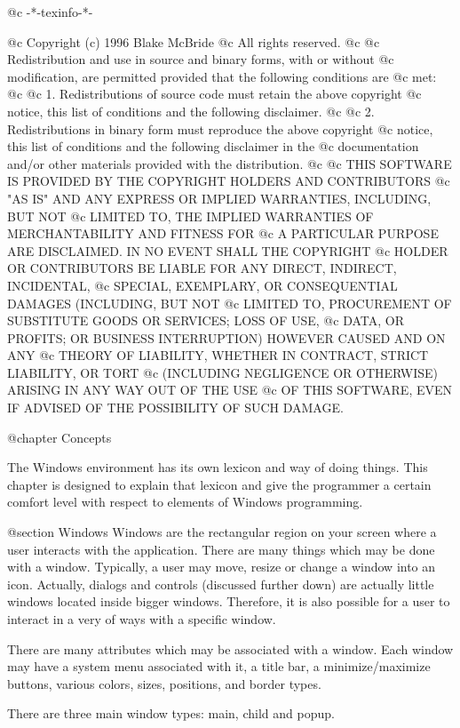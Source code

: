 @c -*-texinfo-*-

@c  Copyright (c) 1996 Blake McBride
@c  All rights reserved.
@c
@c  Redistribution and use in source and binary forms, with or without
@c  modification, are permitted provided that the following conditions are
@c  met:
@c
@c  1. Redistributions of source code must retain the above copyright
@c  notice, this list of conditions and the following disclaimer.
@c
@c  2. Redistributions in binary form must reproduce the above copyright
@c  notice, this list of conditions and the following disclaimer in the
@c  documentation and/or other materials provided with the distribution.
@c
@c  THIS SOFTWARE IS PROVIDED BY THE COPYRIGHT HOLDERS AND CONTRIBUTORS
@c  "AS IS" AND ANY EXPRESS OR IMPLIED WARRANTIES, INCLUDING, BUT NOT
@c  LIMITED TO, THE IMPLIED WARRANTIES OF MERCHANTABILITY AND FITNESS FOR
@c  A PARTICULAR PURPOSE ARE DISCLAIMED. IN NO EVENT SHALL THE COPYRIGHT
@c  HOLDER OR CONTRIBUTORS BE LIABLE FOR ANY DIRECT, INDIRECT, INCIDENTAL,
@c  SPECIAL, EXEMPLARY, OR CONSEQUENTIAL DAMAGES (INCLUDING, BUT NOT
@c  LIMITED TO, PROCUREMENT OF SUBSTITUTE GOODS OR SERVICES; LOSS OF USE,
@c  DATA, OR PROFITS; OR BUSINESS INTERRUPTION) HOWEVER CAUSED AND ON ANY
@c  THEORY OF LIABILITY, WHETHER IN CONTRACT, STRICT LIABILITY, OR TORT
@c  (INCLUDING NEGLIGENCE OR OTHERWISE) ARISING IN ANY WAY OUT OF THE USE
@c  OF THIS SOFTWARE, EVEN IF ADVISED OF THE POSSIBILITY OF SUCH DAMAGE.


@chapter Concepts

The Windows environment has its own lexicon and way of doing things.
This chapter is designed to explain that lexicon and give the programmer
a certain comfort level with respect to elements of Windows programming.

@section Windows
Windows are the rectangular region on your screen where a user interacts
with the application.  There are many things which may be done with a window.
Typically, a user may move, resize or change a window into an icon.  Actually,
dialogs and controls (discussed further down) are actually little windows
located inside bigger windows.  Therefore, it is also possible for a user to
interact in a very of ways with a specific window.

There are many attributes which may be associated with a window.  Each
window may have a system menu associated with it, a title bar, a
minimize/maximize buttons, various colors, sizes, positions, and border
types.  

There are three main window types: main, child and popup.



